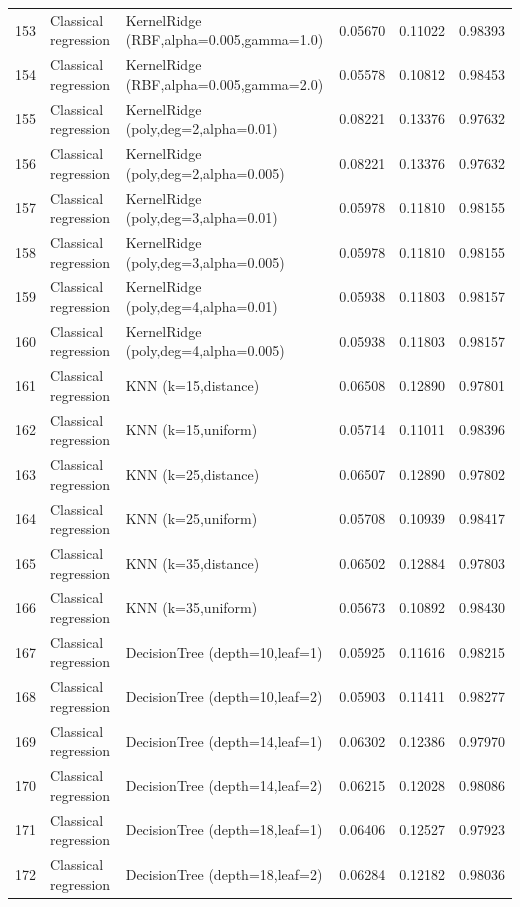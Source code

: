 \documentclass[10pt]{article}
\begin{document}
\begin{longtable}{C{0.75cm}L{2.35cm}L{8.0cm}C{1.15cm}C{1.15cm}C{1.15cm}}
153 & Classical regression & KernelRidge (RBF,alpha=0.005,gamma=1.0) & 0.05670 & 0.11022 & 0.98393 \\
154 & Classical regression & KernelRidge (RBF,alpha=0.005,gamma=2.0) & 0.05578 & 0.10812 & 0.98453 \\
155 & Classical regression & KernelRidge (poly,deg=2,alpha=0.01) & 0.08221 & 0.13376 & 0.97632 \\
156 & Classical regression & KernelRidge (poly,deg=2,alpha=0.005) & 0.08221 & 0.13376 & 0.97632 \\
157 & Classical regression & KernelRidge (poly,deg=3,alpha=0.01) & 0.05978 & 0.11810 & 0.98155 \\
158 & Classical regression & KernelRidge (poly,deg=3,alpha=0.005) & 0.05978 & 0.11810 & 0.98155 \\
159 & Classical regression & KernelRidge (poly,deg=4,alpha=0.01) & 0.05938 & 0.11803 & 0.98157 \\
160 & Classical regression & KernelRidge (poly,deg=4,alpha=0.005) & 0.05938 & 0.11803 & 0.98157 \\
161 & Classical regression & KNN (k=15,distance) & 0.06508 & 0.12890 & 0.97801 \\
162 & Classical regression & KNN (k=15,uniform) & 0.05714 & 0.11011 & 0.98396 \\
163 & Classical regression & KNN (k=25,distance) & 0.06507 & 0.12890 & 0.97802 \\
164 & Classical regression & KNN (k=25,uniform) & 0.05708 & 0.10939 & 0.98417 \\
165 & Classical regression & KNN (k=35,distance) & 0.06502 & 0.12884 & 0.97803 \\
166 & Classical regression & KNN (k=35,uniform) & 0.05673 & 0.10892 & 0.98430 \\
167 & Classical regression & DecisionTree (depth=10,leaf=1) & 0.05925 & 0.11616 & 0.98215 \\
168 & Classical regression & DecisionTree (depth=10,leaf=2) & 0.05903 & 0.11411 & 0.98277 \\
169 & Classical regression & DecisionTree (depth=14,leaf=1) & 0.06302 & 0.12386 & 0.97970 \\
170 & Classical regression & DecisionTree (depth=14,leaf=2) & 0.06215 & 0.12028 & 0.98086 \\
171 & Classical regression & DecisionTree (depth=18,leaf=1) & 0.06406 & 0.12527 & 0.97923 \\
172 & Classical regression & DecisionTree (depth=18,leaf=2) & 0.06284 & 0.12182 & 0.98036 \\

\end{longtable}
\end{document}
